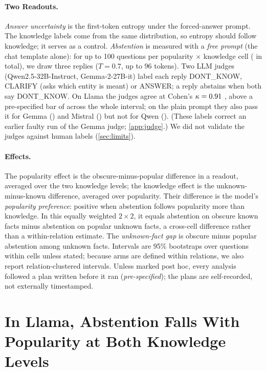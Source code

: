 \documentclass[manuscript,screen,review,anonymous,nonacm]{acmart}
\begin{document}
\paragraph{Two Readouts.} \emph{Answer uncertainty} is the first-token entropy under the forced-answer prompt. The knowledge labels come from the same distribution, so entropy should follow knowledge; it serves as a control. \emph{Abstention} is measured with a \emph{free prompt} (the chat template alone): for up to 100 questions per popularity $\times$ knowledge cell (\hmLlamaItems{} in total), we draw three replies ($T=0.7$, up to 96 tokens). Two LLM judges (Qwen2.5-32B-Instruct, Gemma-2-27B-it) label each reply DONT\_KNOW, CLARIFY (asks which entity is meant) or ANSWER; a reply abstains when both say DONT\_KNOW. On Llama the judges agree at Cohen's $\kappa=0.91$ \lkKappaCI, above a pre-specified bar of \kappaBar{} across the whole interval; on the plain prompt they also pass it for Gemma (\hmGemmaKappa) and Mistral (\hmMistralKappa) but not for Qwen (\hmQwenKappa). (These labels correct an earlier faulty run of the Gemma judge; \cref{app:judge}.) We did not validate the judges against human labels (\cref{sec:limits}).

\paragraph{Effects.} The popularity effect is the obscure-minus-popular difference in a readout, averaged over the two knowledge levels; the knowledge effect is the unknown-minus-known difference, averaged over popularity. Their difference is the model's \emph{popularity preference}: positive when abstention follows popularity more than knowledge. In this equally weighted $2\times2$, it equals abstention on obscure known facts minus abstention on popular unknown facts, a cross-cell difference rather than a within-relation estimate. The \emph{unknown-fact gap} is obscure minus popular abstention among unknown facts. Intervals are 95\% bootstraps over questions within cells unless stated; because arms are defined within relations, we also report relation-clustered intervals. Unless marked post hoc, every analysis followed a plan written before it ran (\emph{pre-specified}); the plans are self-recorded, not externally timestamped.

\section{In Llama, Abstention Falls With Popularity at Both Knowledge Levels}
\label{sec:main}
\end{document}
